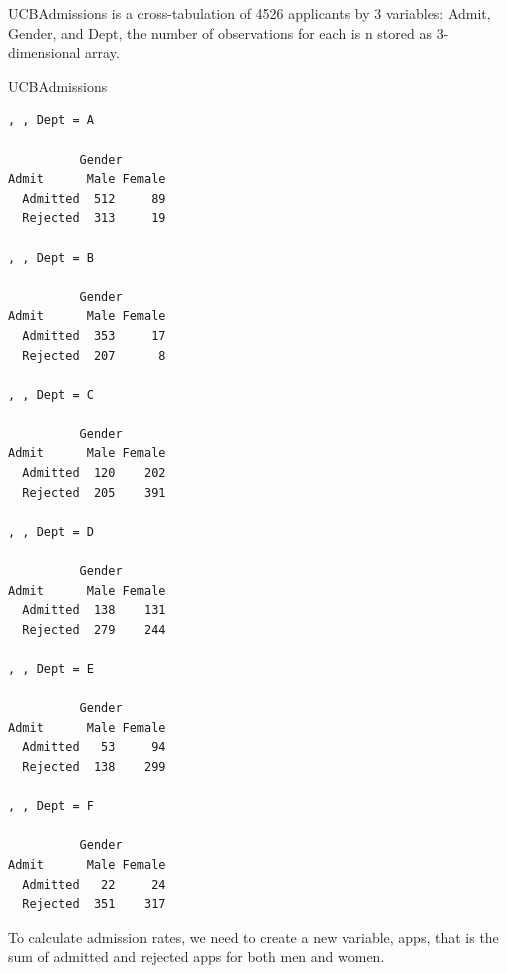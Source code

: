 \documentclass[]{book}
\newenvironment{Shaded}{\begin{snugshade}}{\end{snugshade}}
\newcommand{\CommentTok}[1]{\textcolor[rgb]{0.56,0.35,0.01}{\textit{#1}}}
\newcommand{\DataTypeTok}[1]{\textcolor[rgb]{0.13,0.29,0.53}{#1}}
\newcommand{\KeywordTok}[1]{\textcolor[rgb]{0.13,0.29,0.53}{\textbf{#1}}}
\newcommand{\NormalTok}[1]{#1}
\newcommand{\OperatorTok}[1]{\textcolor[rgb]{0.81,0.36,0.00}{\textbf{#1}}}
\newcommand{\StringTok}[1]{\textcolor[rgb]{0.31,0.60,0.02}{#1}}
\begin{document}
UCBAdmissions is a cross-tabulation of 4526 applicants by 3 variables: Admit, Gender, and Dept, the number of observations for each is n stored as 3-dimensional array.

\begin{Shaded}
\begin{Highlighting}[]
\NormalTok{UCBAdmissions}
\end{Highlighting}
\end{Shaded}

\begin{verbatim}
, , Dept = A

          Gender
Admit      Male Female
  Admitted  512     89
  Rejected  313     19

, , Dept = B

          Gender
Admit      Male Female
  Admitted  353     17
  Rejected  207      8

, , Dept = C

          Gender
Admit      Male Female
  Admitted  120    202
  Rejected  205    391

, , Dept = D

          Gender
Admit      Male Female
  Admitted  138    131
  Rejected  279    244

, , Dept = E

          Gender
Admit      Male Female
  Admitted   53     94
  Rejected  138    299

, , Dept = F

          Gender
Admit      Male Female
  Admitted   22     24
  Rejected  351    317
\end{verbatim}

To calculate admission rates, we need to create a new variable, apps, that is the sum of admitted and rejected apps for both men and women.

\begin{Shaded}
\end{Shaded}
\end{document}
